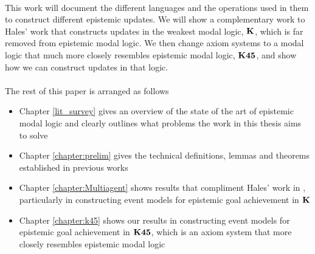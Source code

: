 \\
This work will document the different languages and the operations used in them to construct
different epistemic updates.
We will show a complementary work to Hales' work that constructs updates in the weakest modal logic,
$\bf K$, which is far removed from epistemic modal logic.
We then change axiom systems to a modal logic that much more closely resembles epistemic modal
logic, $\bf K45$, and show how we can construct updates in that logic.\\
\\
The rest of this paper is arranged as follows
\begin{itemize}
	\item Chapter \ref{lit_survey} gives an overview of the state of the art of epistemic modal logic
		and clearly outlines what problems the work in this thesis aims to solve
	\item Chapter \ref{chapter:prelim} gives the technical definitions, lemmas and theorems
		established in previous works
	\item Chapter \ref{chapter:Multiagent} shows results that compliment Hales' work in
		\cite{hales13synthesis}, particularly in constructing event models for epistemic goal
		achievement in $\bf K$
	\item Chapter \ref{chapter:k45} shows our results in constructing event models for epistemic goal
		achievement in $\bf K45$, which is an axiom system that more closely resembles epistemic modal
		logic
\end{itemize}
